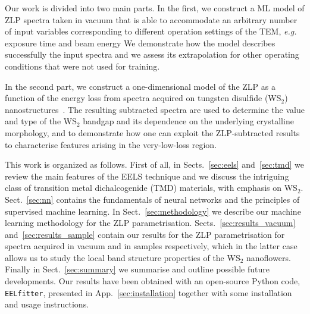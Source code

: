 Our work is divided into two main parts.
%
In the first, we construct a ML model of ZLP spectra taken
in vacuum that is able to accommodate an arbitrary number of input
variables corresponding to different operation settings of the TEM, 
{\it e.g.} exposure time and beam energy
%
We demonstrate how the model describes successfully the
input spectra and we assess its extrapolation for other operating
conditions that were not used for training.

In the second part, we construct a one-dimensional model
of the ZLP as a function of the energy loss from spectra acquired on
tungsten disulfide (WS$_2$) nanostructures~\cite{SabryaWS2}.
%
The resulting subtracted spectra are used to determine
the value and type of the WS$_2$ bandgap
and its dependence on the underlying crystalline morphology, 
and to demonstrate how one can exploit the ZLP-subtracted results
to characterise features arising in the very-low-loss region.

This work is organized as follows.
%
First of all, in Sects.~\ref{sec:eels} and~\ref{sec:tmd}
we review the main features of the EELS technique and
we discuss the intriguing class of transition metal 
dichalcogenide (TMD) materials, with emphasis on WS$_2$.
%
Sect.~\ref{sec:nn} contains
the fundamentals of neural networks and the principles
of supervised machine learning.
%
In Sect.~\ref{sec:methodology} we describe our machine learning methodology
for the ZLP parametrisation.
%
Sects.~\ref{sec:results_vacuum} and~\ref{sec:results_sample} contain
our results for the ZLP parametrisation for spectra acquired
in vacuum and in samples respectively, which in the latter
case allows us to study the local band structure properties
of the WS$_2$ nanoflowers.
%
Finally in Sect.~\ref{sec:summary} we summarise
and outline possible future developments.
%
Our results have been obtained with an open-source {\sc Python} code,
{\tt EELfitter}, presented in App.~\ref{sec:installation}
together with some installation and usage instructions.
